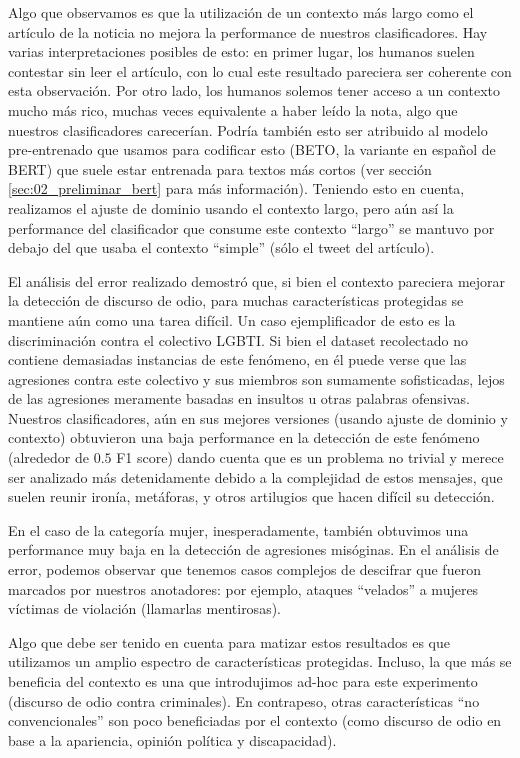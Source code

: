 Algo que observamos es que la utilización de un contexto más largo como el artículo de la noticia no mejora la performance de nuestros clasificadores. Hay varias interpretaciones posibles de esto: en primer lugar, los humanos suelen contestar sin leer el artículo, con lo cual este resultado pareciera ser coherente con esta observación. Por otro lado, los humanos solemos tener acceso a un contexto mucho más rico, muchas veces equivalente a haber leído la nota, algo que nuestros clasificadores carecerían. Podría también esto ser atribuido al modelo pre-entrenado que usamos para codificar esto (BETO, la variante en español de BERT) que suele estar entrenada para textos más cortos (ver sección \ref{sec:02_preliminar_bert} para más información). Teniendo esto en cuenta, realizamos el ajuste de dominio usando el contexto largo, pero aún así la performance del clasificador que consume este contexto ``largo'' se mantuvo por debajo del que usaba el contexto ``simple'' (sólo el tweet del artículo).

El análisis del error realizado demostró que, si bien el contexto pareciera mejorar la detección de discurso de odio, para muchas características protegidas se mantiene aún como una tarea difícil. Un caso ejemplificador de esto es la discriminación contra el colectivo LGBTI. Si bien el dataset recolectado no contiene demasiadas instancias de este fenómeno, en él puede verse que las agresiones contra este colectivo y sus miembros son sumamente sofisticadas, lejos de las agresiones meramente basadas en insultos u otras palabras ofensivas. Nuestros clasificadores, aún en sus mejores versiones (usando ajuste de dominio y contexto) obtuvieron una baja performance en la detección de este fenómeno (alrededor de $0.5$ F1 score) dando cuenta que es un problema no trivial y merece ser analizado más detenidamente debido a la complejidad de estos mensajes, que suelen reunir ironía, metáforas, y otros artilugios que hacen difícil su detección.

En el caso de la categoría mujer, inesperadamente, también obtuvimos una performance muy baja en la detección de agresiones misóginas. En el análisis de error, podemos observar que tenemos casos complejos de descifrar que fueron marcados por nuestros anotadores: por ejemplo, ataques ``velados'' a mujeres víctimas de violación (llamarlas mentirosas). 

Algo que debe ser tenido en cuenta para matizar estos resultados es que utilizamos un amplio espectro de características protegidas. Incluso, la que más se beneficia del contexto es una que introdujimos ad-hoc para este experimento (discurso de odio contra criminales). En contrapeso, otras características ``no convencionales'' son poco beneficiadas por el contexto (como discurso de odio en base a la apariencia, opinión política y discapacidad).

